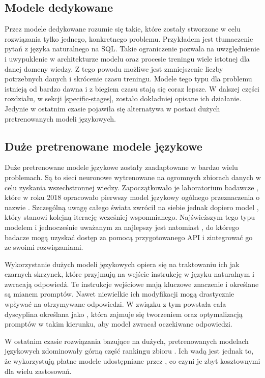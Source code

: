 \subsection{Modele dedykowane}
Przez modele dedykowane rozumie się takie, które zostały stworzone w celu rozwiązania tylko jednego, konkretnego problemu. Przykładem jest tłumaczenie pytań z języka naturalnego na SQL. Takie ograniczenie pozwala na uwzględnienie i uwypuklenie w architekturze modelu oraz procesie treningu wiele istotnej dla danej domeny wiedzy. Z tego powodu możliwe jest zmniejszenie liczby potrzebnych danych i skrócenie czasu treningu. Modele tego typu dla problemu  istnieją od bardzo dawna i z biegiem czasu stają się coraz lepsze. W dalszej części rozdziału, w sekcji \ref{specific-stages}, zostało dokładniej opisane ich działanie. Jedynie w ostatnim czasie pojawiła się alternatywa w postaci dużych pretrenowanych modeli językowych.

\subsection{Duże pretrenowane modele językowe}
Duże pretrenowane modele językowe zostały zaadaptowane w bardzo wielu problemach. Są to sieci neuronowe wytrenowane na ogromnych zbiorach danych w celu zyskania wszechstronnej wiedzy. Zapoczątkowało je laboratorium badawcze , które w roku 2018 opracowało pierwszy model językowy ogólnego przeznaczenia o nazwie  . Szczególną uwagę całego świata zwrócił na siebie jednak dopiero model , który stanowi kolejną iterację wcześniej wspomnianego. Najświeższym tego typu modelem i jednocześnie uważanym za najlepszy jest natomiast , do którego badacze mogą uzyskać dostęp za pomocą przygotowanego API i zintegrować go ze swoimi rozwiązaniami.

Wykorzystanie dużych modeli językowych opiera się na traktowaniu ich jak czarnych skrzynek, które przyjmują na wejście instrukcję w języku naturalnym i zwracają odpowiedź. Te instrukcje wejściowe mają kluczowe znaczenie i określane są mianem promptów. Nawet niewielkie ich modyfikacji mogą drastycznie wpływać na otrzymywane odpowiedzi. W związku z tym powstała cała dyscyplina określana jako , która zajmuje się tworzeniem oraz optymalizacją promptów w takim kierunku, aby model zwracał oczekiwane odpowiedzi.

W ostatnim czasie rozwiązania bazujące na dużych, pretrenowanych modelach językowych zdominowały górną część rankingu zbioru . Ich wadą jest jednak to, że wykorzystują płatne modele udostępniane przez , co czyni je zbyt kosztownymi dla wielu zastosowań.

